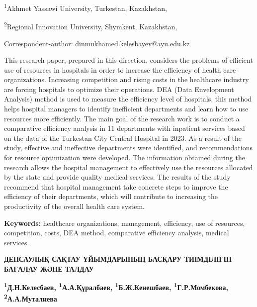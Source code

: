 



\begin{affiliation}
\textsuperscript{1}Akhmet Yassawi University, Turkestan, Kazakhstan,

\textsuperscript{2}Regional Innovation University, Shymkent, Kazakhstan,

\raggedright \textsuperscript{\envelope } Correspondent-author: dinmukhamed.kelesbayev@ayu.edu.kz
\end{affiliation}

This research paper, prepared in this direction, considers the problems
of efficient use of resources in hospitals in order to increase the
efficiency of health care organizations. Increasing competition and
rising costs in the healthcare industry are forcing hospitals to
optimize their operations. DEA (Data Envelopment Analysis) method is
used to measure the efficiency level of hospitals, this method helps
hospital managers to identify inefficient departments and learn how to
use resources more efficiently. The main goal of the research work is to
conduct a comparative efficiency analysis in 11 departments with
inpatient services based on the data of the Turkestan City Central
Hospital in 2023. As a result of the study, effective and ineffective
departments were identified, and recommendations for resource
optimization were developed. The information obtained during the
research allows the hospital management to effectively use the resources
allocated by the state and provide quality medical services. The results
of the study recommend that hospital management take concrete steps to
improve the efficiency of their departments, which will contribute to
increasing the productivity of the overall health care system.

{\bfseries Keywords:} healthcare organizations, management, efficiency, use
of resources, competition, costs, DEA method, comparative efficiency
analysis, medical services.

\begin{articleheader}
{\bfseries ДЕНСАУЛЫҚ САҚТАУ ҰЙЫМДАРЫНЫҢ БАСҚАРУ ТИІМДІЛІГІН БАҒАЛАУ ЖӘНЕ ТАЛДАУ}

{\bfseries
\textsuperscript{1}Д.Н.Келесбаев\textsuperscript{\envelope },
\textsuperscript{1}А.А.Құралбаев,
\textsuperscript{1}Б.Ж.Кенешбаев,
\textsuperscript{1}Г.Р.Момбекова,
\textsuperscript{2}А.А.Муталиева
}
\end{articleheader}

